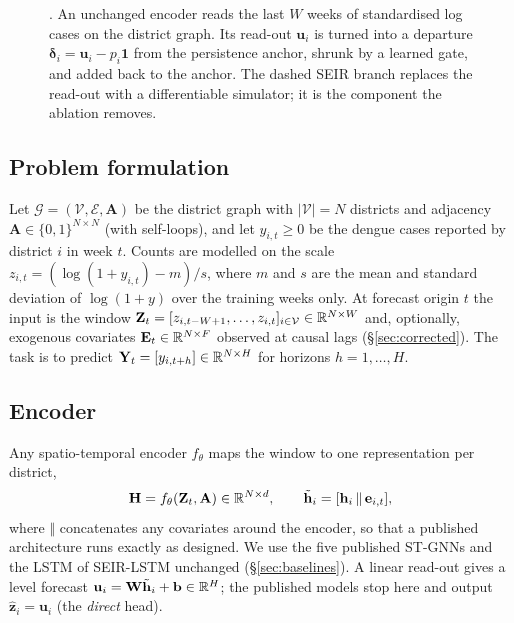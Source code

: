 \begin{figure}[t]
\caption{\model{}. An unchanged encoder reads the last $W$ weeks of standardised log cases
on the district graph. Its read-out $\mathbf{u}_i$ is turned into a departure
$\boldsymbol{\delta}_i=\mathbf{u}_i-p_i\mathbf{1}$ from the persistence anchor, shrunk by
a learned gate, and added back to the anchor. The dashed SEIR branch replaces the
read-out with a differentiable simulator; it is the component the ablation removes.}
\label{fig:overview}
\end{figure}

\subsection{Problem formulation}
Let $\mathcal{G}=(\mathcal{V},\mathcal{E},\mathbf{A})$ be the district graph with
$|\mathcal{V}|=N$ districts and adjacency $\mathbf{A}\in\{0,1\}^{N\times N}$ (with
self-loops), and let $y_{i,t}\ge 0$ be the dengue cases reported by district $i$ in
week $t$. Counts are modelled on the scale
$z_{i,t}=(\log(1+y_{i,t})-m)/s$, where $m$ and $s$ are the mean and standard deviation
of $\log(1+y)$ over the training weeks only. At forecast origin $t$ the input is the
window $\mathbf{Z}_t=[z_{i,t-W+1},\dots,z_{i,t}]_{i\in\mathcal{V}}\in\mathbb{R}^{N\times W}$ and,
optionally, exogenous covariates $\mathbf{E}_t\in\mathbb{R}^{N\times F}$ observed at causal
lags (\S\ref{sec:corrected}). The task is to predict
$\mathbf{Y}_t=[y_{i,t+h}]\in\mathbb{R}^{N\times H}$ for horizons $h=1,\dots,H$.

\subsection{Encoder}
Any spatio-temporal encoder $f_\theta$ maps the window to one representation per
district,
\begin{equation}
  \mathbf{H}=f_\theta(\mathbf{Z}_t,\mathbf{A})\in\mathbb{R}^{N\times d},\qquad
  \tilde{\mathbf{h}}_i=[\mathbf{h}_i\,\Vert\,\mathbf{e}_{i,t}],
\end{equation}
where $\Vert$ concatenates any covariates around the encoder, so that a published
architecture runs exactly as designed. We use the five published ST-GNNs and the LSTM
of SEIR-LSTM unchanged (\S\ref{sec:baselines}). A linear read-out gives a level
forecast $\mathbf{u}_i=\mathbf{W}\tilde{\mathbf{h}}_i+\mathbf{b}\in\mathbb{R}^{H}$; the
published models stop here and output $\hat{\mathbf{z}}_i=\mathbf{u}_i$ (the
\emph{direct} head).

